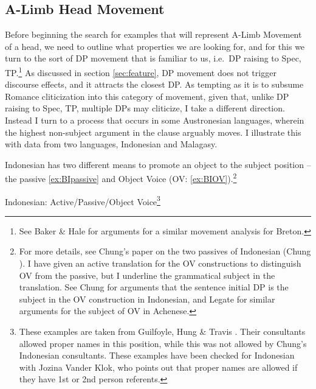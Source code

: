 \documentclass[output=paper,colorlinks,citecolor=brown,
]{langscibook}
\begin{document}
\subsection{A-Limb Head Movement}

Before beginning the search for examples that will represent A-Limb Movement of a head, we need to outline what properties we are looking for, and for this we turn to the sort of DP movement that is familiar to us, i.e.\ DP raising to Spec, TP.\footnote{See Baker \& Hale \citeyearpar{Baker:1990} for arguments for a similar movement analysis for Breton.}  As discussed in section \ref{sec:feature}, DP movement does not trigger discourse effects, and it attracts the closest DP.  As tempting as it is to subsume Romance cliticization into this category of movement, given that, unlike DP raising to Spec, TP, multiple DPs may cliticize, I take a different direction. Instead I turn to a process that occurs in some Austronesian languages, wherein  the highest non-subject argument in the clause arguably moves.  I illustrate this with data from two languages, Indonesian and Malagasy.

Indonesian has two different means to promote an object to the subject position -- the passive \ref{ex:BIpassive} and Object Voice (OV: \ref{ex:BIOV}).\footnote{For more details, see Chung's paper on the two passives of Indonesian (Chung \citeyear{Chung:1976a}). I have given an active translation for the OV constructions to distinguish OV from the passive, but I underline the grammatical subject in the translation.  See Chung \citeyearpar{Chung:1976a} for arguments that the sentence initial DP is the subject in the OV construction in Indonesian, and Legate \citeyearpar{Legate:2014} for similar arguments for the subject of OV in Achenese.}

\ea Indonesian: Active/Passive/Object Voice\footnote{These examples are taken from Guilfoyle, Hung \& Travis \citeyearpar{Guilfoyle:1992}.  Their consultants allowed proper names in this position, while this was not allowed by Chung's Indonesian consultants.  These examples have been checked for Indonesian with Jozina Vander Klok, who points out that proper names are allowed if they have 1st or 2nd person referents.}
\end{document}
